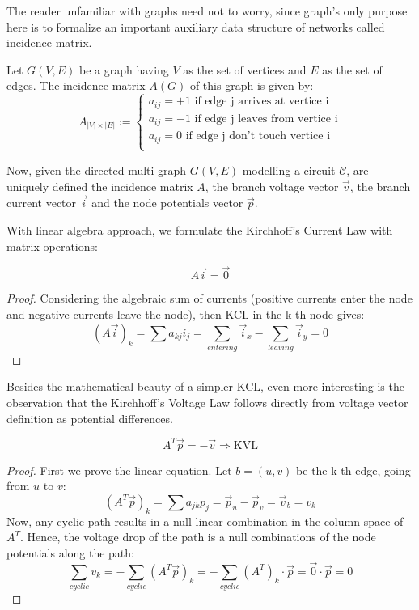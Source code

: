 \documentclass{comjnl}
\begin{document}
The reader unfamiliar with graphs need not to worry, since graph's only purpose here is to formalize an important auxiliary data structure of networks called incidence matrix.

\begin{definition}
Let $G(V,E)$ be a graph having $V$ as the set of vertices and $E$ as the set of edges. The incidence matrix $A(G)$ of this graph is given by:
$$ A_{|V|\times|E|} :=
\begin{cases} 
a_{ij}=+1 \mbox{ if edge j arrives at vertice i}\\
a_{ij}=-1 \mbox{ if edge j leaves from vertice i}\\
a_{ij}=0 \mbox{ if edge j don't touch vertice i}\\
\end{cases}$$
\end{definition}

Now, given the directed multi-graph $G(V,E)$ modelling a circuit $\mathcal{C}$, are uniquely defined the incidence matrix $A$, the branch voltage vector $\vec{v}$, the branch current vector $\vec{i}$ and the node potentials vector $\vec{p}$.

With linear algebra approach, we formulate the Kirchhoff's Current Law with matrix operations:
\begin{theorem}[KCL]
\label{KCL:matrix}
$$A\vec{i} = \vec{0}$$
\end{theorem}
\begin{proof}
Considering the algebraic sum of currents (positive currents enter the node and negative currents leave the node), then KCL in the k-th node gives:
$$(A\vec{i})_k = \sum a_{kj}i_j = \sum_{entering} \vec{i}_x - \sum_{leaving} \vec{i}_y = 0 $$
\end{proof}

Besides the mathematical beauty of a simpler KCL, even more interesting is the observation that the Kirchhoff's Voltage Law follows directly from voltage vector definition as potential differences.

\begin{theorem}[KVL]
\label{KVL:matrix}
$$ A^T\vec{p}=-\vec{v} \Rightarrow \mbox{KVL}  $$
\end{theorem}
\begin{proof}
First we prove the linear equation. Let $b=(u,v)$ be the k-th edge, going from $u$ to $v$:
$$(A^T\vec{p})_k = \sum a_{jk}p_j = \vec{p}_u - \vec{p}_v = \vec{v}_b = v_k$$
Now, any cyclic path results in a null linear combination in the column space of $A^T$. Hence, the voltage drop of the path is a null combinations of the node potentials along the path:
$$ \sum_{cyclic}v_k = - \sum_{cyclic} (A^T\vec{p})_k  = - \sum_{cyclic} (A^T)_k \cdot \vec{p} = \vec{0} \cdot \vec{p} = 0$$
\end{proof}
\end{document}
